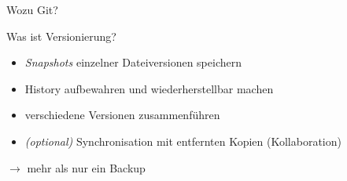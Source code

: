 \begin{frame}{Wozu Git?}
{
    }
\fi
\end{frame}

\begin{frame}{Was ist Versionierung?}
    \begin{itemize}
        \item \emph{Snapshots} einzelner Dateiversionen speichern
        \item History aufbewahren und wiederherstellbar machen
        \item verschiedene Versionen zusammenführen
        \item \emph{(optional)} Synchronisation mit entfernten Kopien (Kollaboration)
    \end{itemize}
    $\rightarrow$ mehr als nur ein Backup
\end{frame}

